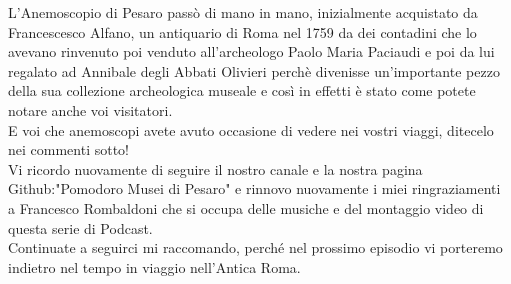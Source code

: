 \documentclass[hidelinks,12pt,a4paper]{article}
\begin{document}
\begin{flushleft}
		L'Anemoscopio di Pesaro passò di mano in mano, inizialmente acquistato da Francescesco Alfano, un antiquario di Roma nel 1759 da dei contadini che lo avevano rinvenuto poi venduto all'archeologo Paolo Maria Paciaudi e poi da lui regalato ad Annibale degli Abbati Olivieri perchè divenisse un'importante pezzo della sua collezione archeologica museale e così in effetti è stato come potete notare anche voi visitatori.\\
		E voi che anemoscopi avete avuto occasione di vedere nei vostri viaggi, ditecelo nei commenti sotto!\\
		Vi ricordo nuovamente di seguire il nostro canale e la nostra pagina Github:"Pomodoro Musei di Pesaro" e rinnovo nuovamente i miei ringraziamenti a Francesco Rombaldoni che si occupa delle musiche e del montaggio video di questa serie di Podcast.\\
		Continuate a seguirci  mi raccomando, perché nel prossimo episodio vi porteremo indietro nel tempo in viaggio nell'Antica Roma.\\
		

\end{flushleft}
\end{document}
